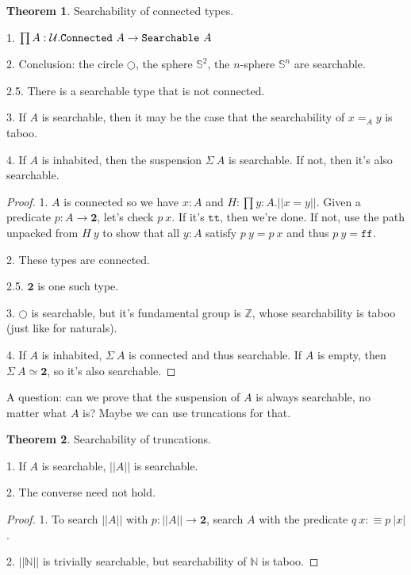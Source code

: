 \documentclass[11pt]{article}
\theoremstyle{definition}
\newtheorem{theorem}{Theorem}[section]
\newcommand{\txt}[1]{\texttt{#1}}
\renewcommand{\(}{\left(}
\renewcommand{\)}{\right)}
\newcommand{\defn}{:\equiv}
\newcommand{\U}{\mathcal{U}}
\newcommand{\apl}[2]{#1\ #2}
\newcommand{\hequiv}[2]{#1 \simeq #2}
\newcommand{\Bool}{\mathbf{2}}
\newcommand{\true}{\txt{tt}}
\newcommand{\false}{\txt{ff}}
\newcommand{\Nat}{\mathbb{N}}
\newcommand{\dprod}[2]{\prod #1.#2}
\newcommand{\trf}[1]{||#1||}
\newcommand{\tri}[1]{|#1|}
\begin{document}
\newcommand{\Sphere}{\mathbb{S}^2}
\newcommand{\nSphere}[1]{\mathbb{S}^{#1}}
\newcommand{\Susp}{\Sigma}
\newcommand{\Z}{\mathbb{Z}}
\begin{theorem}
Searchability of connected types.

1. $\dprod{A : \U}{\apl{\Connected}{A} \to \apl{\Searchable}{A}}$

2. Conclusion: the circle $\Circle$, the sphere $\Sphere$, the $n$-sphere $\nSphere{n}$ are searchable.

2.5. There is a searchable type that is not connected.

3. If $A$ is searchable, then it may be the case that the searchability of $x =_A y$ is taboo.

4. If $A$ is inhabited, then the suspension $\apl{\Susp}{A}$ is searchable. If not, then it's also searchable.

\end{theorem}
\begin{proof}
1. $A$ is connected so we have $x : A$ and $H : \dprod{y : A}{\trf{x = y}}$. Given a predicate $p : A \to \Bool$, let's check $\apl{p}{x}$. If it's $\true$, then we're done. If not, use the path unpacked from $\apl{H}{y}$ to show that all $y : A$ satisfy $\apl{p}{y} = \apl{p}{x}$ and thus $\apl{p}{y} = \false$.

2. These types are connected.

2.5. $\Bool$ is one such type.

3. $\Circle$ is searchable, but it's fundamental group is $\Z$, whose searchability is taboo (just like for naturals).

4. If $A$ is inhabited, $\apl{\Susp}{A}$ is connected and thus searchable. If $A$ is empty, then $\hequiv{\apl{\Susp}{A}}{\Bool}$, so it's also searchable.
\end{proof}

A question: can we prove that the suspension of $A$ is always searchable, no matter what $A$ is? Maybe we can use truncations for that.

\begin{theorem}
Searchability of truncations.

1. If $A$ is searchable, $\trf{A}$ is searchable.

2. The converse need not hold.
\end{theorem}
\begin{proof}
1. To search $\trf{A}$ with $p : \trf{A} \to \Bool$, search $A$ with the predicate $\apl{q}{x} \defn \apl{p}{\tri{x}}$.

2. $\trf{\Nat}$ is trivially searchable, but searchability of $\Nat$ is taboo.
\end{proof}
\end{document}
